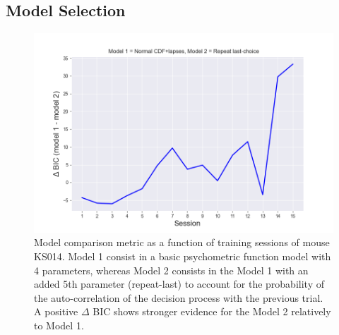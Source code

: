 \documentclass[paper=a4, fontsize=11pt]{scrartcl}
\numberwithin{equation}{section}		%
\numberwithin{figure}{section}			%
\numberwithin{table}{section}				%
\begin{document}
\subsection{Model Selection}

\begin{figure}
\vspace{-80pt}
  \begin{center}
    \includegraphics[width=\linewidth]{BIC.png}
  \end{center}
  \vspace{-20pt}
\caption{Model comparison metric as a function of training sessions of mouse KS014. Model 1 consist in a basic psychometric function model with 4 parameters, whereas Model 2 consists in the Model 1 with an added 5th parameter (repeat-last) to account for the probability of the auto-correlation of the decision process with the previous trial. A positive $\Delta$ BIC shows stronger evidence for the Model 2 relatively to Model 1.}
\label{fig:selec}
\end{figure}
\end{document}
